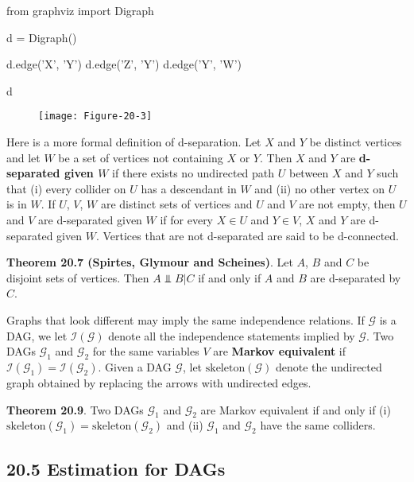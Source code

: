 \begin{python}
from graphviz import Digraph

d = Digraph()

d.edge('X', 'Y')
d.edge('Z', 'Y')
d.edge('Y', 'W')

d
\end{python}

\begin{figure}[H]
\centering
\texttt{[image: Figure-20-3]}
\end{figure}


Here is a more formal definition of d-separation. Let \(X\) and \(Y\) be
distinct vertices and let \(W\) be a set of vertices not containing
\(X\) or \(Y\). Then \(X\) and \(Y\) are \textbf{d-separated given
\(W\)} if there exists no undirected path \(U\) between \(X\) and \(Y\)
such that (i) every collider on \(U\) has a descendant in \(W\) and (ii)
no other vertex on \(U\) is in \(W\). If \(U\), \(V\), \(W\) are
distinct sets of vertices and \(U\) and \(V\) are not empty, then \(U\)
and \(V\) are d-separated given \(W\) if for every \(X \in U\) and
\(Y \in V\), \(X\) and \(Y\) are d-separated given \(W\). Vertices that
are not d-separated are said to be d-connected.

\textbf{Theorem 20.7 (Spirtes, Glymour and Scheines)}. Let \(A\), \(B\)
and \(C\) be disjoint sets of vertices. Then \(A \text{ ⫫ } B | C\) if
and only if \(A\) and \(B\) are d-separated by \(C\).

Graphs that look different may imply the same independence relations. If
\(\mathcal{G}\) is a DAG, we let \(\mathcal{I}(\mathcal{G})\) denote all
the independence statements implied by \(\mathcal{G}\). Two DAGs
\(\mathcal{G}_{1}\) and \(\mathcal{G}_{2}\) for the same variables \(V\) are
\textbf{Markov equivalent} if
\(\mathcal{I}(\mathcal{G}_{1}) = \mathcal{I}(\mathcal{G}_{2})\). Given a DAG
\(\mathcal{G}\), let \(\text{skeleton}(\mathcal{G})\) denote the
undirected graph obtained by replacing the arrows with undirected edges.

\textbf{Theorem 20.9}. Two DAGs \(\mathcal{G}_{1}\) and \(\mathcal{G}_{2}\)
are Markov equivalent if and only if (i)
\(\text{skeleton}(\mathcal{G}_{1}) = \text{skeleton}(\mathcal{G}_{2})\) and
(ii) \(\mathcal{G}_{1}\) and \(\mathcal{G}_{2}\) have the same colliders.

\subsection*{20.5 Estimation for DAGs}\label{estimation-for-dags}

